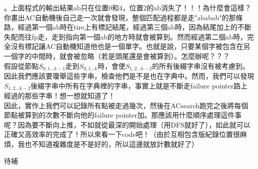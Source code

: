 。上面程式的輸出結果ab只在位置$0$和$4$，位置$2$的ab消失了！！！為什麼會這樣？你畫出AC自動機後自己走一次就會發現，整個匹配過程都是走"ababab"的那條路，經過第一個ab時在tire上有標記結尾，經過第三個ab時，因為結尾加上的不斷失配而往fp走，走到指向第一個ab的地方時就會被算到。然而經過第二個ab時，完全沒有標記讓AC自動機知道他也是一個單字。也就是說，只要某個字被包含在另一個字的中間時，就會被忽略（若是頭尾還是會被算到）。怎麼辦呢？？？\\

假設從節點$S_{0,1\dots k-1}$走到$S_{0,1\dots k}$時，會使$S_{1,2\dots k-2}$的所有後綴字串沒有被考慮到。因此我們應該要瓊舉這些字串，檢查他們是不是也在字典中。然而，我們可以發現$S_{1,2\dots k-2}$後綴字串中所有在字典裡的字串，事實上就是不斷走failure pointer路上經過的那些字串！想一想就知道了！\\

因此，實作上我們可以記錄所有點被走過幾次，然後在ACsearch跑完之後將每個節點被算到的次數不斷向他的failure pointer加。那應該用什麼順序處理這件事呢？因為要不斷向上推，不如就從最深的開始處理（用DFS就好了），如此就可以正確又高效率的完成了！所以來看一下code吧！（由於互相包含版紀錄位置很麻煩，我也不知道複雜度是不是好的，所以這邊就放計數就好了）
\begin{C++}
待補
\end{C++}